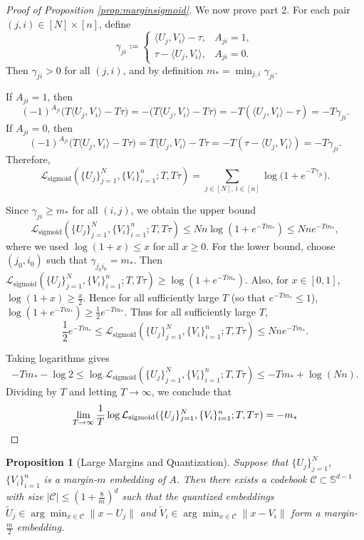 \documentclass[preprint]{article}
\newtheorem{proposition}{Proposition}[]
\newcommand{\sigloss}{\mathcal{L}_{\text{sigmoid}}}
\begin{document}
\begin{proof}[Proof of Proposition \ref{prop:marginsigmoid}]
We now prove part 2. For each pair $(j,i) \in [N] \times [n]$, define
$$
\gamma_{ji}\coloneqq
\begin{cases}
\langle U_j,V_i\rangle-\tau, & A_{ji}=1,\\[4pt]
\tau-\langle U_j,V_i\rangle, & A_{ji}=0.
\end{cases}
$$
Then $\gamma_{ji}>0$ for all $(j,i)$, and by definition $m_*=\min_{j,i}\gamma_{ji}$.

If $A_{ji}=1$, then
$$
(-1)^{A_{ji}}\bigl(T\langle U_j,V_i\rangle-T\tau\bigr)
=
-\bigl(T\langle U_j,V_i\rangle-T\tau\bigr)
=
-T(\langle U_j,V_i\rangle-\tau)
=
-T\gamma_{ji}.
$$
If $A_{ji}=0$, then
$$
(-1)^{A_{ji}}\bigl(T\langle U_j,V_i\rangle-T\tau\bigr)
=
T\langle U_j,V_i\rangle-T\tau
=
-T(\tau-\langle U_j,V_i\rangle)
=
-T\gamma_{ji}.
$$
Therefore,
$$
\sigloss(\{U_j\}_{j=1}^N,\{V_i\}_{i=1}^n;T,T\tau)
=
\sum_{j\in[N],\,i\in[n]}\log\!\bigl(1+e^{-T\gamma_{ji}}\bigr).
$$

Since $\gamma_{ji}\ge m_*$ for all $(i,j)$, we obtain the upper bound
$$\sigloss(\{U_j\}_{j = 1}^N,\{V_i\}_{i = 1}^n;T,T\tau)
\leq
Nn\log(1+e^{-Tm_*})
\leq
Nne^{-Tm_*},
$$
where we used $\log(1+x)\le x$ for all $x\ge0$. For the lower bound, choose $(j_0,i_0)$ such that $\gamma_{j_0i_0}=m_*$. Then $\sigloss(\{U_j\}_{j=1}^N,\{V_i\}_{i = 1}^n;T,T\tau)
\ge
\log(1+e^{-Tm_*})$. Also, for $x\in[0,1]$, $\log(1+x)\ge \frac{x}{2}$. Hence for all sufficiently large $T$ (so that $e^{-Tm_*}\le1$), $\log(1+e^{-Tm_*})\ge \frac12 e^{-Tm_*}$. Thus for all sufficiently large $T$,
$$
\frac{1}{2} e^{-Tm_*}
\leq
\sigloss(\{U_j\}_{j = 1}^N,\{V_i\}_{i = 1}^n;T,T\tau)
\le
Nne^{-Tm_*}.
$$

Taking logarithms gives
$$
-Tm_*-\log 2
\le
\log \sigloss(\{U_j\}_{j = 1}^N,\{V_i\}_{i = 1}^n;T,T\tau)
\le
-Tm_*+\log(Nn).
$$
Dividing by $T$ and letting $T\to\infty$, we conclude that
$$
\lim_{T\to\infty}
\frac{1}{T}\log \sigloss(\{U_j\}_{j = 1}^N,\{V_i\}_{i = 1}^n;T,T\tau)
=
-m_*\qedhere
$$
\end{proof}


\begin{proposition}[Large Margins and Quantization]
\label{prop:marginquantization}
Suppose that $\{U_j\}_{j = 1}^N$, $\{V_i\}_{i = 1}^n$ is a margin-$m$ embedding of $A$. Then there exists a codebook $\mathcal{C} \subset \mathbb{S}^{d-1}$ with size $|\mathcal{C}| \leq \left(1 + \frac{8}{m}\right)^d$ such that the quantized embeddings $\tilde{U}_j \in \arg\min_{x \in \mathcal{C}} \|x - U_j\|$ and $\tilde{V}_i \in \arg\min_{x \in \mathcal{C}} \|x - V_i\|$ form a margin-$\frac{m}{2}$ embedding.
\end{proposition}
\end{document}
